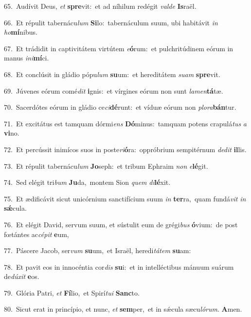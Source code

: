 {\numbfont\textcolor{\numbcolor}{65.}}~Audívit Deus, \textit{et} \textbf{spre}\-vit:~\star et ad níhilum redégit \textit{val}\-\textit{de} \textbf{Is}\-raël.\par
{\numbfont\textcolor{\numbcolor}{66.}}~Et répulit tabernácu\textit{lum} \textbf{Si}\-lo:~\star tabernáculum suum, ubi habitávit \textit{in} \textit{ho}\-\textbf{mí}nibus.\par
{\numbfont\textcolor{\numbcolor}{67.}}~Et trádidit in captivitátem virtútem \textit{e}\-\textbf{ó}rum:~\star et pulchritúdinem eórum in manus \textit{in}\-\textit{i}\textbf{mí}ci.\par
{\numbfont\textcolor{\numbcolor}{68.}}~Et conclúsit in gládio pópu\textit{lum} \textbf{su}\-um:~\star et hereditátem \textit{su}\-\textit{am} \textbf{spre}\-vit.\par
{\numbfont\textcolor{\numbcolor}{69.}}~Júvenes eórum comé\textit{dit} \textbf{i}\-gnis:~\star et vírgines eórum non sunt \textit{la}\-\textit{men}\textbf{tá}tæ.\par
{\numbfont\textcolor{\numbcolor}{70.}}~Sacerdótes eórum in gládio ce\-\textit{ci}\-\textbf{dé}runt:~\star et víduæ eórum non \textit{plo}\-\textit{ra}\textbf{bán}tur.\par
{\numbfont\textcolor{\numbcolor}{71.}}~Et excitátus est tamquam dórmi\textit{ens} \textbf{Dó}\-minus:~\star tamquam potens crapulá\textit{tus} \textit{a} \textbf{vi}\-no.\par
{\numbfont\textcolor{\numbcolor}{72.}}~Et percússit inimícos suos in poste\-\textit{ri}\-\textbf{ó}ra:~\star oppróbrium sempitérnum \textit{de}\-\textit{dit} \textbf{il}\-lis.\par
{\numbfont\textcolor{\numbcolor}{73.}}~Et répulit tabernácu\textit{lum} \textbf{Jo}\-seph:~\star et tribum Ephraim \textit{non} \textit{e}\-\textbf{lé}git.\par
{\numbfont\textcolor{\numbcolor}{74.}}~Sed elégit tri\textit{bum} \textbf{Ju}\-da,~\star montem Sion \textit{quem} \textit{di}\-\textbf{lé}xit.\par
{\numbfont\textcolor{\numbcolor}{75.}}~Et ædificávit sicut unicórnium sanctifícium suum \textit{in} \textbf{ter}\-ra,~\star quam fundá\textit{vit} \textit{in} \textbf{sǽ}\-cula.\par
{\numbfont\textcolor{\numbcolor}{76.}}~Et elégit David, servum suum, et sústulit eum de grégi\textit{bus} \textbf{ó}\-vium:~\star de post fœtántes ac\-\textit{cé}\-\textit{pit} \textbf{e}\-um,\par
{\numbfont\textcolor{\numbcolor}{77.}}~Páscere Jacob, ser\textit{vum} \textbf{su}\-um,~\star et Israël, heredi\-\textit{tá}\-\textit{tem} \textbf{su}\-am:\par
{\numbfont\textcolor{\numbcolor}{78.}}~Et pavit eos in innocéntia cor\textit{dis} \textbf{su}\-i:~\star et in intelléctibus mánuum suárum de\-\textit{dú}\-\textit{xit} \textbf{e}\-os.\par
{\numbfont\textcolor{\numbcolor}{79.}}~Glória Patri, \textit{et} \textbf{Fí}\-lio,~\star et Spirí\-\textit{tu}\-\textit{i} \textbf{Sanc}\-to.\par
{\numbfont\textcolor{\numbcolor}{80.}}~Sicut erat in princípio, et nunc, \textit{et} \textbf{sem}\-per,~\star et in sǽcula sæcu\-\textit{ló}\-\textit{rum}. \textbf{A}\-men.\par
